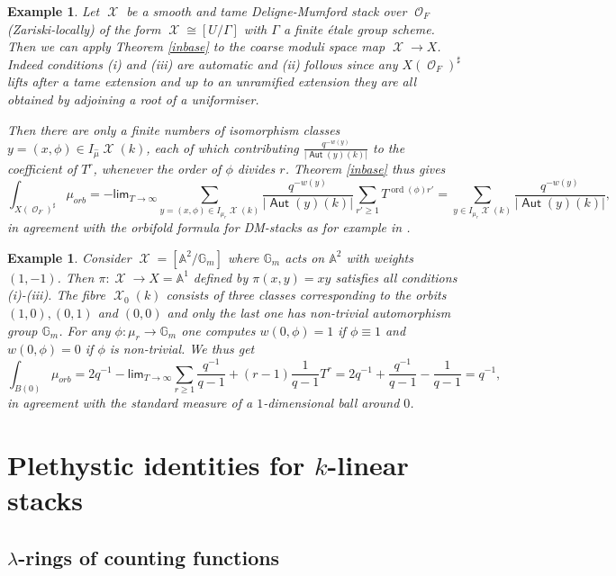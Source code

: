 \documentclass{article}
\DeclareMathOperator{\Xc}{\mathcal{X}}
\DeclareMathOperator{\Oc}{\mathcal{O}}
\renewcommand{\lim}{\mathsf{lim}}
\DeclareMathOperator{\Aut}{\mathsf{Aut}}
\DeclareMathOperator{\ord}{ord}
\newcommand{\BA}{{\mathbb{A}}}
\newcommand{\BG}{{\mathbb{G}}}
\theoremstyle{definition}
\theoremstyle{plain}
\newtheorem{example}[definition]{Example}
\begin{document}
\begin{example}\label{DMcase} Let $\Xc$ be a smooth and tame Deligne-Mumford stack over $\Oc_F$ (Zariski-locally) of the form $\Xc \cong [U/\Gamma]$ with $\Gamma$ a finite étale group scheme. Then we can apply Theorem \ref{inbase} to the coarse moduli space map $\Xc \to X$. Indeed conditions (i) and (iii) are automatic and (ii) follows since any $X(\Oc_F)^\sharp$ lifts after a tame extension and up to an unramified extension they are all obtained by adjoining a root of a uniformiser. 

Then there are only a finite numbers of isomorphism classes $y=(x,\phi) \in I_{\hat{\mu}}\Xc(k)$, each of which contributing $\frac{q^{-w(y)}}{|\Aut(y)(k)|}$ to the coefficient of $T^r$, whenever the order of $\phi$ divides $r$. Theorem \ref{inbase} thus gives
\[ \int_{X(\Oc_F)^\sharp}\mu_{orb} =  -\lim_{T\to \infty}  \sum_{y = (x,\phi) \in I_{\mu_r}\Xc(k)} \frac{q^{-w(y)}}{|\Aut(y)(k)|}\sum_{r' \geq 1} T^{\ord(\phi)r'} = \sum_{y  \in I_{\mu_r}\Xc(k)} \frac{q^{-w(y)}}{|\Aut(y)(k)|}, \]
in agreement with the orbifold formula for DM-stacks as for example in \cite[Theorem 2.21]{GWZ20b}.
\end{example}



\begin{example} Consider $\Xc = [\BA^2/\BG_m]$ where $\BG_m$ acts on $\BA^2$ with weights $(1,-1)$. Then $\pi:\Xc \to X = \BA^1$ defined by $\pi(x,y) = xy$ satisfies all conditions (i)-(iii). The fibre $\Xc_0(k)$ consists of three classes corresponding to the orbits $(1,0), (0,1)$ and $(0,0)$ and only the last one has non-trivial automorphism group $\BG_m$. For any $\phi:\mu_r \to \BG_m$ one computes $w(0,\phi) = 1$ if $\phi \equiv 1$ and $w(0,\phi)  = 0$ if $\phi$ is non-trivial. We thus get 
\[ \int_{B(0)}  \mu_{orb} = 2q^{-1}  -\lim_{T\to \infty}\sum_{r\geq 1}  \frac{q^{-1}}{q-1} + (r-1) \frac{1}{q-1}T^r = 2q^{-1} +\frac{q^{-1}}{q-1} - \frac{1}{q-1} = q^{-1}, \]
in agreement with the standard measure of a $1$-dimensional ball around $0$. 
\end{example}



\section{Plethystic identities for $k$-linear stacks}\label{pikls}

\subsection{$\lambda$-rings of counting functions}
\end{document}
